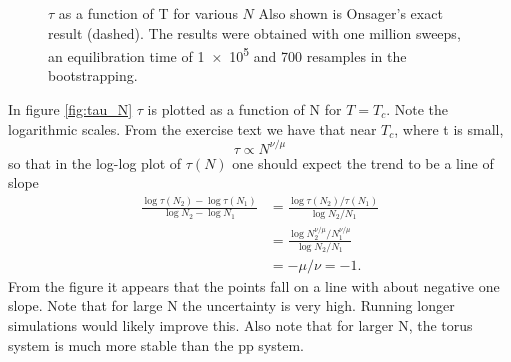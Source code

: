 \documentclass[12pt, a4paper]{article}
\begin{document}
\begin{figure}[H]
  \centering
  \caption{$\tau$ as a function of T for various $N$
    Also shown is Onsager's exact result (dashed).
    The results were obtained with one million sweeps, an equilibration time of \num{1e5} and 700 resamples in the bootstrapping.
    \label{fig:tau_T}}
\end{figure}


In figure \ref{fig:tau_N} $\tau$ is plotted as a function of N for $T = T_c$.
Note the logarithmic scales.
From the exercise text we have that near $T_c$, where t is small,
\begin{equation}
  \tau \propto N^{\nu/\mu}
\end{equation}
so that in the log-log plot of $\tau(N)$ one should expect the trend to be a line of slope
\begin{align}
  \frac{\log\tau(N_2) - \log\tau(N_1)}{\log N_2 - \log N_1}
  &= \frac{\log \tau(N_2)/\tau(N_1)}{\log N_2/N_1} \\
  &= \frac{\log N_2^{\nu/\mu}/N_1^{\nu/\mu}}{\log N_2/N_1}\\
  &= -\mu/\nu = -1.
\end{align}
From the figure it appears that the points fall on a line with about negative one slope.
Note that for large N the uncertainty is very high.
Running longer simulations would likely improve this.
Also note that for larger N, the torus system is much more stable than the pp system.
\end{document}
